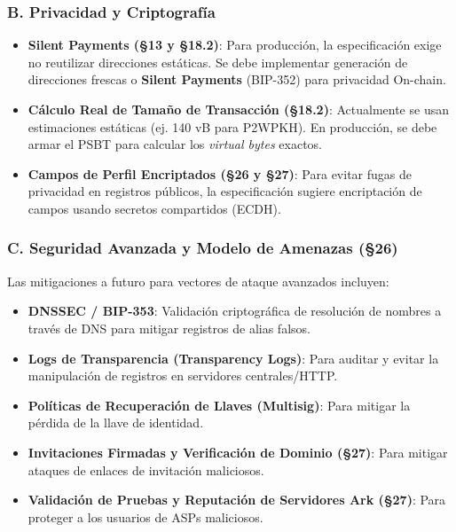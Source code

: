 \documentclass[
]{article}
\providecommand{\tightlist}{%
  \setlength{\itemsep}{0pt}\setlength{\parskip}{0pt}}
\begin{document}
\hypertarget{b.-privacidad-y-criptografuxeda}{%
\subsubsection{B. Privacidad y
Criptografía}\label{b.-privacidad-y-criptografuxeda}}

\begin{itemize}
\tightlist
\item
  \textbf{Silent Payments (§13 y §18.2)}: Para producción, la
  especificación exige no reutilizar direcciones estáticas. Se debe
  implementar generación de direcciones frescas o \textbf{Silent
  Payments} (BIP-352) para privacidad On-chain.
\item
  \textbf{Cálculo Real de Tamaño de Transacción (§18.2)}: Actualmente se
  usan estimaciones estáticas (ej. 140 vB para P2WPKH). En producción,
  se debe armar el PSBT para calcular los \emph{virtual bytes} exactos.
\item
  \textbf{Campos de Perfil Encriptados (§26 y §27)}: Para evitar fugas
  de privacidad en registros públicos, la especificación sugiere
  encriptación de campos usando secretos compartidos (ECDH).
\end{itemize}

\hypertarget{c.-seguridad-avanzada-y-modelo-de-amenazas-26}{%
\subsubsection{C. Seguridad Avanzada y Modelo de Amenazas
(§26)}\label{c.-seguridad-avanzada-y-modelo-de-amenazas-26}}

Las mitigaciones a futuro para vectores de ataque avanzados incluyen:

\begin{itemize}
\tightlist
\item
  \textbf{DNSSEC / BIP-353}: Validación criptográfica de resolución de
  nombres a través de DNS para mitigar registros de alias falsos.
\item
  \textbf{Logs de Transparencia (Transparency Logs)}: Para auditar y
  evitar la manipulación de registros en servidores centrales/HTTP.
\item
  \textbf{Políticas de Recuperación de Llaves (Multisig)}: Para mitigar
  la pérdida de la llave de identidad.
\item
  \textbf{Invitaciones Firmadas y Verificación de Dominio (§27)}: Para
  mitigar ataques de enlaces de invitación maliciosos.
\item
  \textbf{Validación de Pruebas y Reputación de Servidores Ark (§27)}:
  Para proteger a los usuarios de ASPs maliciosos.
\end{itemize}
\end{document}
